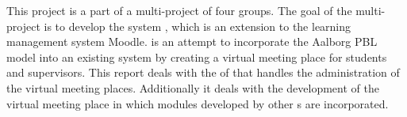 This project is a part of a multi-project of four groups.
The goal of the multi-project is to develop the system \system{}, which is an extension to the learning management system Moodle.
\system{} is an attempt to incorporate the Aalborg PBL model into an existing system by creating a virtual meeting place for students and supervisors.
This report deals with the \subsystem{} of \system{} that handles the administration of the virtual meeting places.
Additionally it deals with the development of the virtual meeting place in which modules developed by other \subgroup{}s are incorporated.